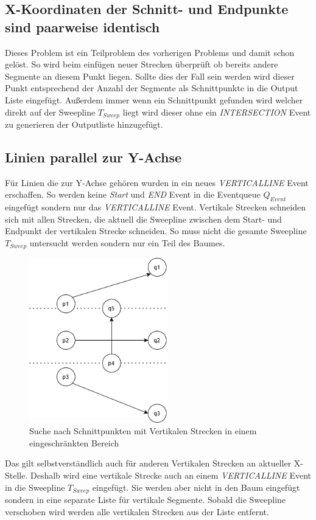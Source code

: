\documentclass[conference]{IEEEtran}
\begin{document}
	\subsection{X-Koordinaten der Schnitt- und Endpunkte sind paarweise identisch}
	Dieses Problem ist ein Teilproblem des vorherigen Problems und damit schon gelöst.
	So wird beim einfügen neuer Strecken überprüft ob bereits andere Segmente an diesem Punkt liegen. Sollte dies der Fall sein werden wird dieser Punkt entsprechend der Anzahl der Segmente als Schnittpunkte in die Output Liste eingefügt. Außerdem immer wenn ein Schnittpunkt gefunden wird welcher direkt auf der Sweepline $T_{Sweep}$ liegt wird dieser ohne ein \textit{INTERSECTION} Event zu generieren der Outputliste hinzugefügt.
	
	\subsection{Linien parallel zur Y-Achse}
	Für Linien die zur Y-Achse gehören wurden in ein neues \textit{VERTICALLINE} Event erschaffen. So werden keine \textit{Start} und \textit{END} Event in die Eventqueue $Q_{Event}$ eingefügt sondern nur das \textit{VERTICALLINE} Event.
	Vertikale Strecken schneiden sich mit allen Strecken, die aktuell die Sweepline zwischen dem Start- und Endpunkt der vertikalen Strecke schneiden. So muss nicht die gesamte Sweepline $T_{Sweep}$ untersucht werden sondern nur ein Teil des Baumes.
	\begin{figure}[h]
		\begin{center}
			\includegraphics[width=6cm]{Vertikal.png}
			\caption{Suche nach Schnittpunkten mit Vertikalen Strecken in einem eingeschränkten Bereich}
			\label{figure_3}
		\end{center}
	\end{figure}
	Das gilt selbstverständlich auch für anderen Vertikalen Strecken an aktueller X-Stelle. Deshalb wird eine vertikale Strecke auch an einem \textit{VERTICALLINE} Event in die Sweepline $T_{Sweep}$ eingefügt. Sie werden aber nicht in den Baum eingefügt sondern in eine separate Liste für vertikale Segmente. Sobald die Sweepline verschoben wird werden alle vertikalen Strecken aus der Liste entfernt.
		
\end{document}
